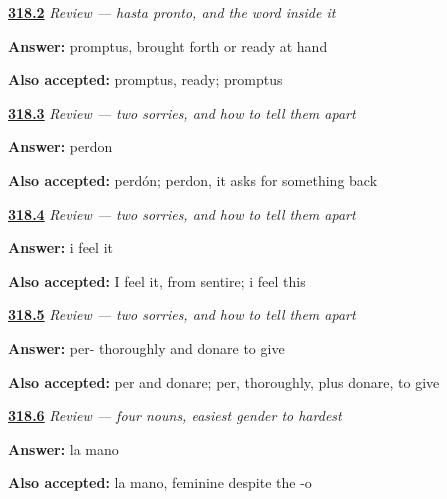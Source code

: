 \noindent\begin{minipage}[t]{\linewidth}
\raggedright
\hyperlink{review-ES-C318-repaso-despedirse-latin}{\textbf{318.2}} \emph{Review — hasta pronto, and the word inside it}\par
\small \textbf{Answer:} promptus, brought forth or ready at hand\par
\footnotesize \textbf{Also accepted:} promptus, ready; promptus
\end{minipage}\par\medskip

\noindent\begin{minipage}[t]{\linewidth}
\raggedright
\hyperlink{review-ES-C318-repaso-disculparse-corridor}{\textbf{318.3}} \emph{Review — two sorries, and how to tell them apart}\par
\small \textbf{Answer:} perdon\par
\footnotesize \textbf{Also accepted:} perdón; perdon, it asks for something back
\end{minipage}\par\medskip

\noindent\begin{minipage}[t]{\linewidth}
\raggedright
\hyperlink{review-ES-C318-repaso-disculparse-literal}{\textbf{318.4}} \emph{Review — two sorries, and how to tell them apart}\par
\small \textbf{Answer:} i feel it\par
\footnotesize \textbf{Also accepted:} I feel it, from sentire; i feel this
\end{minipage}\par\medskip

\noindent\begin{minipage}[t]{\linewidth}
\raggedright
\hyperlink{review-ES-C318-repaso-disculparse-donare}{\textbf{318.5}} \emph{Review — two sorries, and how to tell them apart}\par
\small \textbf{Answer:} per- thoroughly and donare to give\par
\footnotesize \textbf{Also accepted:} per and donare; per, thoroughly, plus donare, to give
\end{minipage}\par\medskip

\noindent\begin{minipage}[t]{\linewidth}
\raggedright
\hyperlink{review-ES-C318-repaso-genero-hand}{\textbf{318.6}} \emph{Review — four nouns, easiest gender to hardest}\par
\small \textbf{Answer:} la mano\par
\footnotesize \textbf{Also accepted:} la mano, feminine despite the -o
\end{minipage}\par\medskip

